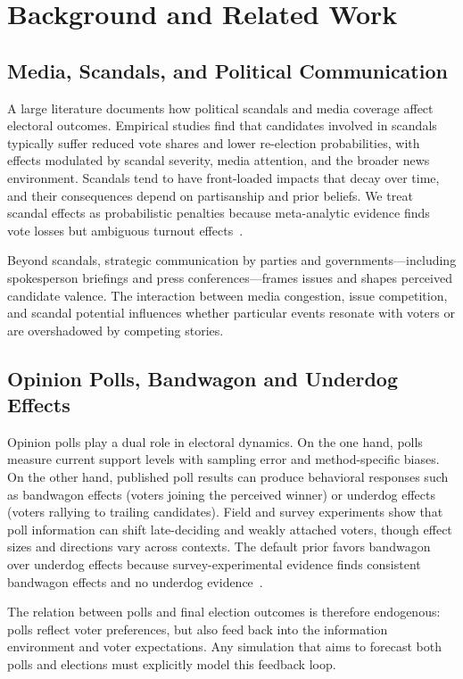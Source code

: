 \documentclass[11pt]{article}
\begin{document}
\section{Background and Related Work}

\subsection{Media, Scandals, and Political Communication}

A large literature documents how political scandals and media coverage affect electoral outcomes. Empirical studies find that candidates involved in scandals typically suffer reduced vote shares and lower re-election probabilities, with effects modulated by scandal severity, media attention, and the broader news environment. Scandals tend to have front-loaded impacts that decay over time, and their consequences depend on partisanship and prior beliefs. We treat scandal effects as probabilistic penalties because meta-analytic evidence finds vote losses but ambiguous turnout effects~\cite{solaz2018scandalmeta}.

Beyond scandals, strategic communication by parties and governments---including spokesperson briefings and press conferences---frames issues and shapes perceived candidate valence. The interaction between media congestion, issue competition, and scandal potential influences whether particular events resonate with voters or are overshadowed by competing stories.

\subsection{Opinion Polls, Bandwagon and Underdog Effects}

Opinion polls play a dual role in electoral dynamics. On the one hand, polls measure current support levels with sampling error and method-specific biases. On the other hand, published poll results can produce behavioral responses such as bandwagon effects (voters joining the perceived winner) or underdog effects (voters rallying to trailing candidates). Field and survey experiments show that poll information can shift late-deciding and weakly attached voters, though effect sizes and directions vary across contexts. The default prior favors bandwagon over underdog effects because survey-experimental evidence finds consistent bandwagon effects and no underdog evidence~\cite{hansen2016polls}.

The relation between polls and final election outcomes is therefore endogenous: polls reflect voter preferences, but also feed back into the information environment and voter expectations. Any simulation that aims to forecast both polls and elections must explicitly model this feedback loop.
\end{document}
